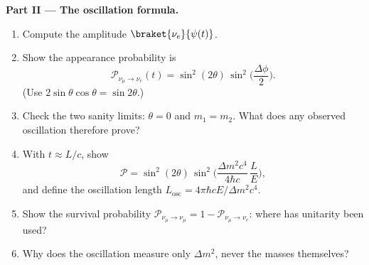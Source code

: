 \begin{problem}
\medskip\noindent\textbf{Part II --- The oscillation formula.}
\begin{enumerate}[resume]
  \item Compute the amplitude $\braket{\nu_e}{\psi(t)}$.
  \item Show the appearance probability is
        \[
        \mathcal P_{\nu_\mu \to \nu_e}(t) =
        \sin^2(2\theta)\,\sin^2\Big(\frac{\Delta\phi}{2}\Big) .
        \]
        (Use $2\sin\theta\cos\theta = \sin2\theta$.)
  \item Check the two sanity limits: $\theta = 0$ and $m_1 = m_2$.
        What does any observed oscillation therefore prove?
  \item With $t \approx L/c$, show
        \[
        \mathcal P = \sin^2(2\theta)\,
        \sin^2\Big(\frac{\Delta m^2c^4}{4\hbar c}\,\frac{L}{E}\Big) ,
        \]
        and define the oscillation length $L_{\text{osc}} =
        4\pi\hbar cE/\Delta m^2c^4$.
  \item Show the survival probability $\mathcal P_{\nu_\mu \to
        \nu_\mu} = 1 - \mathcal P_{\nu_\mu\to\nu_e}$: where has
        unitarity been used?
  \item Why does the oscillation measure only $\Delta m^2$, never
        the masses themselves?
\end{enumerate}


\end{problem}
